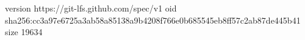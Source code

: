 version https://git-lfs.github.com/spec/v1
oid sha256:cc3a97e6725a3ab58a85138a9b4208f766e0b685545eb8ff57c2ab87de445b41
size 19634
